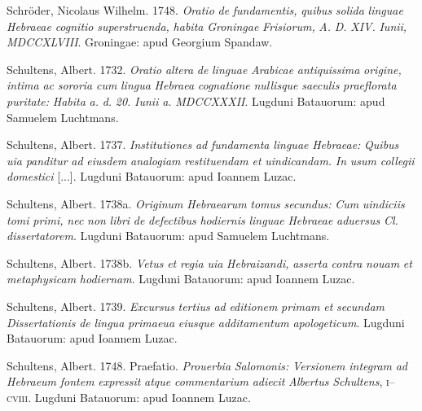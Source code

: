 \documentclass[output=paper]{langsci/langscibook}
\begin{document}
Schröder, Nicolaus Wilhelm. 1748. \textit{Oratio} \textit{de} \textit{fundamentis,} \textit{quibus} \textit{solida} \textit{linguae} \textit{Hebraeae} \textit{cognitio} \textit{superstruenda,} \textit{habita} \textit{Groningae} \textit{Frisiorum,} \textit{A.} \textit{D.} \textit{XIV.} \textit{Iunii,} \textit{MDCCXLVIII}. Groningae: apud Georgium Spandaw.

Schultens, Albert. 1732. \textit{Oratio} \textit{altera} \textit{de} \textit{linguae} \textit{Arabicae} \textit{antiquissima} \textit{origine,} \textit{intima} \textit{ac} \textit{sororia} \textit{cum} \textit{lingua} \textit{Hebraea} \textit{cognatione} \textit{nullisque} \textit{saeculis} \textit{praeflorata} \textit{puritate:} \textit{Habita} \textit{a.} \textit{d.} \textit{20.} \textit{Iunii} \textit{a.} \textit{MDCCXXXII}. Lugduni Batauorum: apud Samuelem Luchtmans.

Schultens, Albert. 1737. \textit{Institutiones} \textit{ad} \textit{fundamenta} \textit{linguae} \textit{Hebraeae:} \textit{Quibus} \textit{uia} \textit{panditur} \textit{ad} \textit{eiusdem} \textit{analogiam} \textit{restituendam} \textit{et} \textit{uindicandam.} \textit{In} \textit{usum} \textit{collegii} \textit{domestici} [...]. Lugduni Batauorum: apud Ioannem Luzac.

Schultens, Albert. 1738a. \textit{Originum} \textit{Hebraearum} \textit{tomus} \textit{secundus:} \textit{Cum} \textit{uindiciis} \textit{tomi} \textit{primi,} \textit{nec} \textit{non} \textit{libri} \textit{de} \textit{defectibus} \textit{hodiernis} \textit{linguae} \textit{Hebraeae} \textit{aduersus} \textit{Cl.} \textit{dissertatorem}. Lugduni Batauorum: apud Samuelem Luchtmans.

Schultens, Albert. 1738b. \textit{Vetus} \textit{et} \textit{regia} \textit{uia} \textit{Hebraizandi,} \textit{asserta} \textit{contra} \textit{nouam} \textit{et} \textit{metaphysicam} \textit{hodiernam}. Lugduni Batauorum: apud Ioannem Luzac.

Schultens, Albert. 1739. \textit{Excursus} \textit{tertius} \textit{ad} \textit{editionem} \textit{primam} \textit{et} \textit{secundam} \textit{Dissertationis} \textit{de} \textit{lingua} \textit{primaeua} \textit{eiusque} \textit{additamentum} \textit{apologeticum}. Lugduni Batauorum: apud Ioannem Luzac.

Schultens, Albert. 1748. Praefatio. \textit{Prouerbia} \textit{Salomonis:} \textit{Versionem} \textit{integram} \textit{ad} \textit{Hebraeum} \textit{fontem} \textit{expressit} \textit{atque} \textit{commentarium} \textit{adiecit} \textit{Albertus} \textit{Schultens}, \textsc{i}–\textsc{cviii}. Lugduni Batauorum: apud Ioannem Luzac.
\end{document}
